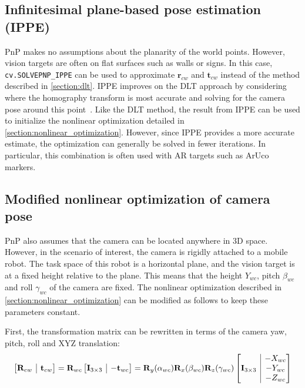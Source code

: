 \documentclass{article}
\makeatletter
\newcommand{\onebytwo}[2]{\ensuremath{\left[\begin{array}{@{}c|c@{}} #1 & #2 \end{array}\right]}}
\makeatother
\begin{document}
\subsection{Infinitesimal plane-based pose estimation (IPPE)}
PnP makes no assumptions about the planarity of the world points. However, vision targets  are often on flat surfaces such as walls or signs. In this case, \verb|cv.SOLVEPNP_IPPE| can be used to approximate $\mathbf{r}_{cw}$ and $\mathbf{t}_{cw}$ instead of the method described in \ref{section:dlt}. IPPE improves on the DLT approach by considering where the homography transform is most accurate and solving for the camera pose around this point~\cite{ippe}. Like the DLT method, the result from IPPE can be used to initialize the nonlinear optimization detailed in \ref{section:nonlinear_optimization}. However, since IPPE provides a more accurate estimate, the optimization can generally be solved in fewer iterations. In particular, this combination is often used with AR targets such as ArUco markers.

\subsection{Modified nonlinear optimization of camera pose}
PnP also assumes that the camera can be located anywhere in 3D space. However, in the scenario of interest, the camera is rigidly attached to a mobile robot. The task space of this robot is a horizontal plane, and the vision target is at a fixed height relative to the plane. This means that the height $Y_{wc}$, pitch $\beta_{wc}$ and roll $\gamma_{wc}$ of the camera are fixed. The nonlinear optimization described in \ref{section:nonlinear_optimization} can be modified as follows to keep these parameters constant.

First, the transformation matrix can be rewritten in terms of the camera yaw, pitch, roll and XYZ translation:
\begin{align*}
    \onebytwo{\mathbf{R}_{cw}}{\mathbf{t}_{cw}} = \mathbf{R}_{wc} \onebytwo{\mathbf{I}_{3 \times 3}}{-\mathbf{t}_{wc}} = \mathbf{R}_y(\alpha_{wc}) \mathbf{R}_x(\beta_{wc}) \mathbf{R}_z(\gamma_{wc}) \onebytwo{\mathbf{I}_{3 \times 3}}{\begin{matrix}-X_{wc} \\ -Y_{wc} \\ -Z_{wc}\end{matrix}} 
\end{align*}
\end{document}
